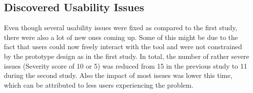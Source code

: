 



\subsection{Discovered Usability Issues}
Even though several usability issues were fixed as compared to the first study, there were also a lot of new ones coming up. Some of this might be due to the fact that users could now freely interact with the tool and were not constrained by the prototype design as in the first study. In total, the number of rather severe issues (Severity score of 10 or 5)  was reduced from 15 in the previous study to 11 during the second study. Also the impact of most issues was lower this time, which can be attributed to less users experiencing the problem.

